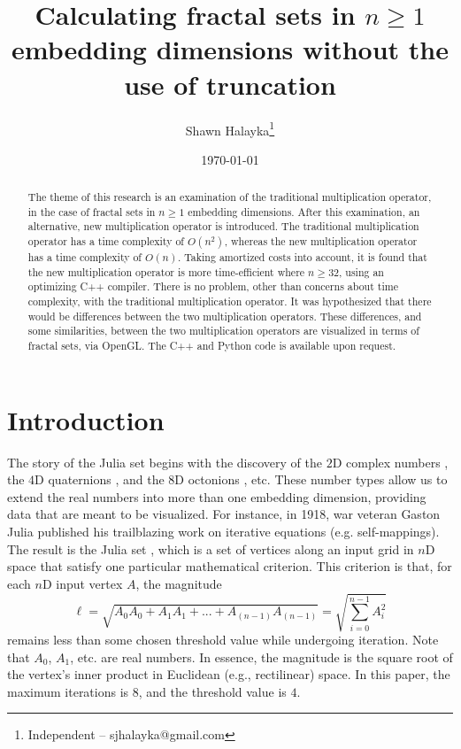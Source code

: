 \documentclass[12pt]{article}
\title{Calculating fractal sets in $n \geq 1$ embedding dimensions without the use of truncation}
\author{
Shawn Halayka\footnote{Independent -- sjhalayka@gmail.com}
}
\date{\today\;\currenttime}
\begin{document}
\maketitle

\begin{abstract}
The theme of this research is an examination of the traditional multiplication operator, in the case of fractal sets in $n \geq 1$ embedding dimensions.
After this examination, an alternative, new multiplication operator is introduced.
The traditional multiplication operator has a time complexity of $O(n^2)$, whereas the new multiplication operator has a time complexity of $O(n)$.
Taking amortized costs into account, it is found that the new multiplication operator is more time-efficient where $n \geq 32$, using an optimizing C++ compiler.
There is no problem, other than concerns about time complexity, with the traditional multiplication operator.
It was hypothesized that there would be differences between the two multiplication operators.
These differences, and some similarities, between the two multiplication operators are visualized in terms of fractal sets, via OpenGL.
The C++ and Python code is available upon request.
\end{abstract}




\section{Introduction}

The story of the Julia set begins with the discovery of the $2$D complex numbers \cite{cardano}, the $4$D quaternions \cite{hamilton}, and the $8$D octonions \cite{graves}, etc.
These number types allow us to extend the real numbers into more than one embedding dimension, providing data that are meant to be visualized.
For instance, in 1918, war veteran Gaston Julia published his trailblazing work on iterative equations (e.g. self-mappings).
The result is the Julia set \cite{julia, fatou}, which is a set of vertices along an input grid in $n$D space that satisfy one particular mathematical criterion. This criterion is that, for each $n$D input vertex $A$, the magnitude 
\begin{equation}
\ell =\sqrt{A_0 A_0 + A_1 A_1 + ... + A_{(n-1)} A_{(n-1)}} = \sqrt{\sum _{i=0}^{n-1} A_i^2}
\end{equation}
remains less than some chosen threshold value while undergoing iteration.
Note that $A_0$, $A_1$, etc. are real numbers.
In essence, the magnitude is the square root of the vertex's inner product in Euclidean (e.g., rectilinear) space.
In this paper, the maximum iterations is $8$, and the threshold value is $4$.
\end{document}
